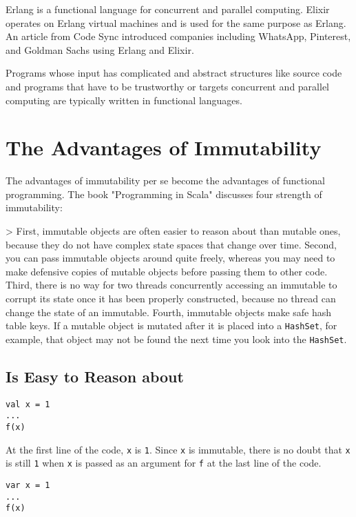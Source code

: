 Erlang is a functional language for concurrent and parallel computing. Elixir
operates on Erlang virtual machines and is used for the same purpose as Erlang.
An article from Code
Sync
introduced companies including WhatsApp, Pinterest, and Goldman Sachs using
Erlang and Elixir.

Programs whose input has complicated and abstract structures like source code and
programs that have to be trustworthy or targets concurrent and parallel computing
are typically written in functional languages.

\section{The Advantages of Immutability}

The advantages of immutability per se become the advantages of functional
programming. The book "Programming in Scala" discusses four strength of
immutability:

> First, immutable objects are often easier to reason about than mutable ones,
because they do not have complex state spaces that change over time. Second, you
can pass immutable objects around quite freely, whereas you may need to make
defensive copies of mutable objects before passing them to other code. Third,
there is no way for two threads concurrently accessing an immutable to corrupt
its state once it has been properly constructed, because no thread can change the
state of an immutable. Fourth, immutable objects make safe hash table keys. If a
mutable object is mutated after it is placed into a \verb!HashSet!, for example,
that object may not be found the next time you look into the \verb!HashSet!.

\subsection{Is Easy to Reason about}

\begin{verbatim}
val x = 1
...
f(x)
\end{verbatim}

At the first line of the code, \verb!x! is \verb!1!. Since \verb!x! is immutable,
there is no doubt that \verb!x! is still \verb!1! when \verb!x! is passed as an
argument for \verb!f! at the last line of the code.

\begin{verbatim}
var x = 1
...
f(x)
\end{verbatim}

